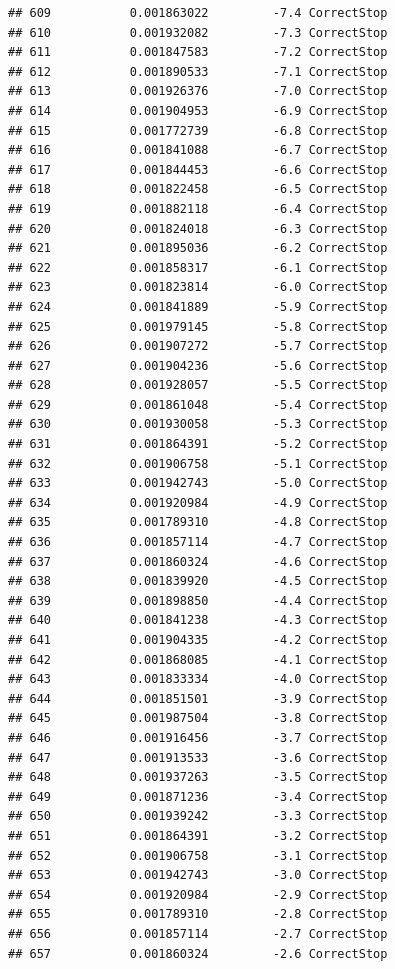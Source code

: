 \documentclass[
]{article}
\begin{document}
\begin{verbatim}
## 609           0.001863022         -7.4 CorrectStop
## 610           0.001932082         -7.3 CorrectStop
## 611           0.001847583         -7.2 CorrectStop
## 612           0.001890533         -7.1 CorrectStop
## 613           0.001926376         -7.0 CorrectStop
## 614           0.001904953         -6.9 CorrectStop
## 615           0.001772739         -6.8 CorrectStop
## 616           0.001841088         -6.7 CorrectStop
## 617           0.001844453         -6.6 CorrectStop
## 618           0.001822458         -6.5 CorrectStop
## 619           0.001882118         -6.4 CorrectStop
## 620           0.001824018         -6.3 CorrectStop
## 621           0.001895036         -6.2 CorrectStop
## 622           0.001858317         -6.1 CorrectStop
## 623           0.001823814         -6.0 CorrectStop
## 624           0.001841889         -5.9 CorrectStop
## 625           0.001979145         -5.8 CorrectStop
## 626           0.001907272         -5.7 CorrectStop
## 627           0.001904236         -5.6 CorrectStop
## 628           0.001928057         -5.5 CorrectStop
## 629           0.001861048         -5.4 CorrectStop
## 630           0.001930058         -5.3 CorrectStop
## 631           0.001864391         -5.2 CorrectStop
## 632           0.001906758         -5.1 CorrectStop
## 633           0.001942743         -5.0 CorrectStop
## 634           0.001920984         -4.9 CorrectStop
## 635           0.001789310         -4.8 CorrectStop
## 636           0.001857114         -4.7 CorrectStop
## 637           0.001860324         -4.6 CorrectStop
## 638           0.001839920         -4.5 CorrectStop
## 639           0.001898850         -4.4 CorrectStop
## 640           0.001841238         -4.3 CorrectStop
## 641           0.001904335         -4.2 CorrectStop
## 642           0.001868085         -4.1 CorrectStop
## 643           0.001833334         -4.0 CorrectStop
## 644           0.001851501         -3.9 CorrectStop
## 645           0.001987504         -3.8 CorrectStop
## 646           0.001916456         -3.7 CorrectStop
## 647           0.001913533         -3.6 CorrectStop
## 648           0.001937263         -3.5 CorrectStop
## 649           0.001871236         -3.4 CorrectStop
## 650           0.001939242         -3.3 CorrectStop
## 651           0.001864391         -3.2 CorrectStop
## 652           0.001906758         -3.1 CorrectStop
## 653           0.001942743         -3.0 CorrectStop
## 654           0.001920984         -2.9 CorrectStop
## 655           0.001789310         -2.8 CorrectStop
## 656           0.001857114         -2.7 CorrectStop
## 657           0.001860324         -2.6 CorrectStop

\end{verbatim}
\end{document}

